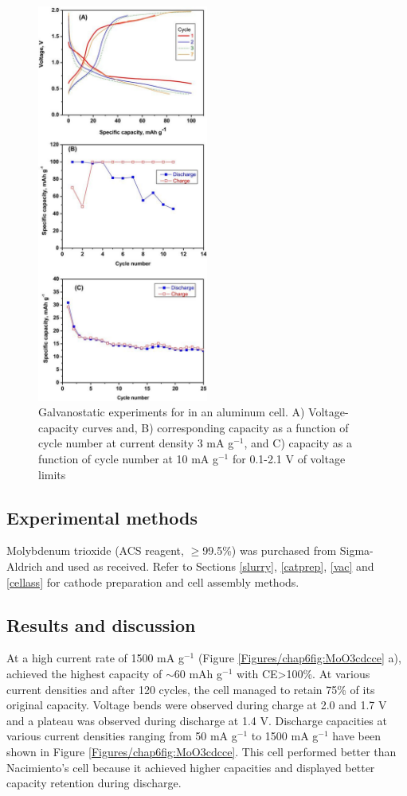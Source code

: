 \begin{figure}[th!]
\centering
\includegraphics[width=0.5\textwidth]{Figures/chap6fig/moo3pap}
\caption{Galvanostatic experiments for  in an aluminum cell. A) Voltage-capacity curves and, B) corresponding capacity as a function of cycle number at current density 3 mA g$^{-1}$, and C) capacity as a function of cycle number at 10 mA g$^{-1}$ for 0.1-2.1 V of voltage limits \cite{nacimiento_exploring_2018}}
\label{Figures/chap6fig:moo3pap}
\end{figure}

\subsection{Experimental methods}
Molybdenum trioxide (ACS reagent, $\geq$99.5\%) was purchased from Sigma-Aldrich and used as received. Refer to Sections \ref{slurry}, \ref{catprep}, \ref{vac} and \ref{cellass} for cathode preparation and cell assembly methods. 

\subsection{Results and discussion}
At a high current rate of 1500 mA g$^{-1}$ (Figure \ref{Figures/chap6fig:MoO3cdcce} a),  achieved the highest capacity of $\sim$60 mAh g$^{-1}$ with CE>100\%. At various current densities and after 120 cycles, the cell managed to retain 75\% of its original capacity. Voltage bends were observed during charge at 2.0 and 1.7 V and a plateau was observed during discharge at 1.4 V. Discharge capacities at various current densities ranging from 50 mA g$^{-1}$ to 1500 mA g$^{-1}$ have been shown in Figure \ref{Figures/chap6fig:MoO3cdcce}. This cell performed better than Nacimiento's cell because it achieved higher capacities and displayed better capacity retention during discharge.  

